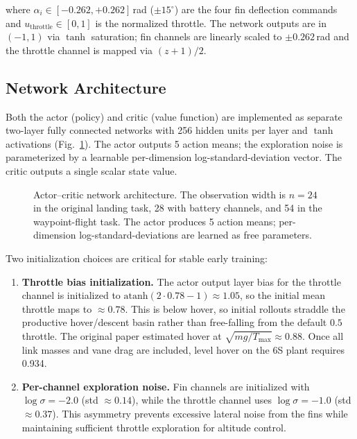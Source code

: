 \documentclass[conference]{IEEEtran}
\begin{document}
\noindent where $\alpha_i \in [-0.262, +0.262]$\,rad ($\pm 15^\circ$) are the four fin deflection commands and $u_{\text{throttle}} \in [0, 1]$ is the normalized throttle. The network outputs are in $(-1, 1)$ via $\tanh$ saturation; fin channels are linearly scaled to $\pm 0.262$\,rad and the throttle channel is mapped via $(z + 1)/2$.

\subsection{Network Architecture}

Both the actor (policy) and critic (value function) are implemented as separate two-layer fully connected networks with 256 hidden units per layer and $\tanh$ activations (Fig.~\ref{fig:network_arch}). The actor outputs 5 action means; the exploration noise is parameterized by a learnable per-dimension log-standard-deviation vector. The critic outputs a single scalar state value.

\begin{figure}[htbp]
\centering
{}
\caption{Actor--critic network architecture. The observation width is $n = 24$ in the original landing task, 28 with battery channels, and 54 in the waypoint-flight task. The actor produces 5 action means; per-dimension log-standard-deviations are learned as free parameters.}
\label{fig:network_arch}
\end{figure}

Two initialization choices are critical for stable early training:

\begin{enumerate}
    \item \textbf{Throttle bias initialization.} The actor output layer bias for the throttle channel is initialized to $\text{atanh}(2 \cdot 0.78 - 1) \approx 1.05$, so the initial mean throttle maps to $\approx 0.78$. This is below hover, so initial rollouts straddle the productive hover/descent basin rather than free-falling from the default $0.5$ throttle. The original paper estimated hover at $\sqrt{mg / T_{\max}} \approx 0.88$. Once all link masses and vane drag are included, level hover on the 6S plant requires 0.934.
    \item \textbf{Per-channel exploration noise.} Fin channels are initialized with $\log\sigma = -2.0$ (std $\approx 0.14$), while the throttle channel uses $\log\sigma = -1.0$ (std $\approx 0.37$). This asymmetry prevents excessive lateral noise from the fins while maintaining sufficient throttle exploration for altitude control.
\end{enumerate}
\end{document}
